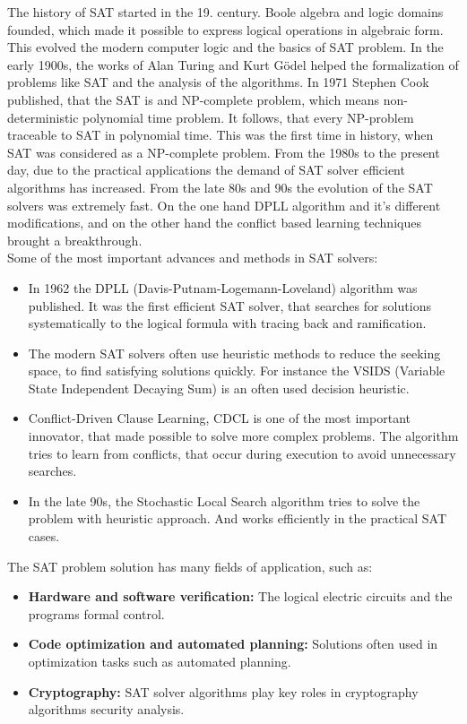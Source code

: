 \documentclass[12pt] {article}
\begin{document}
The history of SAT started in the 19. century. Boole algebra and logic domains founded, which made it possible to express logical operations in algebraic form. This evolved the modern computer logic and the basics of SAT problem. In the early 1900s, the works of Alan Turing and Kurt Gödel helped the formalization of problems like SAT and the analysis of the algorithms. In 1971 Stephen Cook published, that the SAT is and NP-complete problem, which means non-deterministic polynomial time problem. It follows, that every NP-problem traceable to SAT in polynomial time. This was the first time in history, when SAT was considered as a NP-complete problem. From the 1980s to the present day, due to the practical applications the demand of SAT solver efficient algorithms has increased. From the late 80s and 90s the evolution of the SAT solvers was extremely fast. On the one hand DPLL algorithm and it's different modifications, and on the other hand the conflict based learning techniques brought a breakthrough.
\\Some of the most important advances and methods in SAT solvers:
\begin{itemize}
    \item In 1962 the DPLL (Davis-Putnam-Logemann-Loveland) algorithm was published. It was the first efficient SAT solver, that searches for solutions systematically to the logical formula with tracing back and ramification.
    \item The modern SAT solvers often use heuristic methods to reduce the seeking space, to find satisfying solutions quickly. For instance the VSIDS (Variable State Independent Decaying Sum) is an often used decision heuristic.
    \item Conflict-Driven Clause Learning, CDCL is one of the most important innovator, that made possible to solve more complex problems. The algorithm tries to learn from conflicts, that occur during execution to avoid unnecessary searches.
    \item In the late 90s, the Stochastic Local Search algorithm tries to solve the problem with heuristic approach. And works efficiently in the practical SAT cases.
\end{itemize}
The SAT problem solution has many fields of application, such as:
\begin{itemize}
    \item \textbf{Hardware and software verification:} The logical electric circuits and the programs formal control.
    \item \textbf{Code optimization and automated planning:} Solutions often used in optimization tasks such as automated planning.
    \item \textbf{Cryptography:} SAT solver algorithms play key roles in cryptography algorithms security analysis.
\end{itemize}
\end{document}

